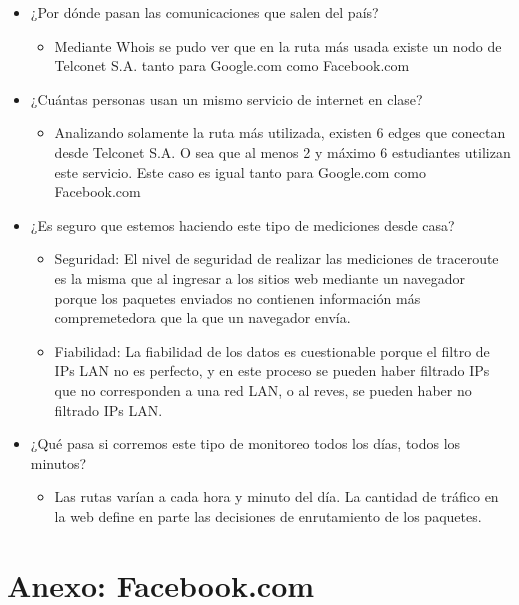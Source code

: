 \documentclass[11pt]{article}
\providecommand{\tightlist}{%
      \setlength{\itemsep}{0pt}\setlength{\parskip}{0pt}}
\begin{document}
\begin{itemize}
\tightlist
\item
  ¿Por dónde pasan las comunicaciones que salen del país?

  \begin{itemize}
  \tightlist
  \item
    Mediante Whois se pudo ver que en la ruta más usada existe un nodo
    de Telconet S.A. tanto para Google.com como Facebook.com
  \end{itemize}
\item
  ¿Cuántas personas usan un mismo servicio de internet en clase?

  \begin{itemize}
  \tightlist
  \item
    Analizando solamente la ruta más utilizada, existen 6 edges que
    conectan desde Telconet S.A. O sea que al menos 2 y máximo 6
    estudiantes utilizan este servicio. Este caso es igual tanto para
    Google.com como Facebook.com
  \end{itemize}
\item
  ¿Es seguro que estemos haciendo este tipo de mediciones desde casa?

  \begin{itemize}
  \tightlist
  \item
    Seguridad: El nivel de seguridad de realizar las mediciones de
    traceroute es la misma que al ingresar a los sitios web mediante un
    navegador porque los paquetes enviados no contienen información más
    compremetedora que la que un navegador envía.
  \item
    Fiabilidad: La fiabilidad de los datos es cuestionable porque el
    filtro de IPs LAN no es perfecto, y en este proceso se pueden haber
    filtrado IPs que no corresponden a una red LAN, o al reves, se
    pueden haber no filtrado IPs LAN.
  \end{itemize}
\item
  ¿Qué pasa si corremos este tipo de monitoreo todos los días, todos los
  minutos?

  \begin{itemize}
  \tightlist
  \item
    Las rutas varían a cada hora y minuto del día. La cantidad de
    tráfico en la web define en parte las decisiones de enrutamiento de
    los paquetes.
  \end{itemize}
\end{itemize}

    \hypertarget{anexo-facebook.com}{%
\section{Anexo: Facebook.com}\label{anexo-facebook.com}}
\end{document}
